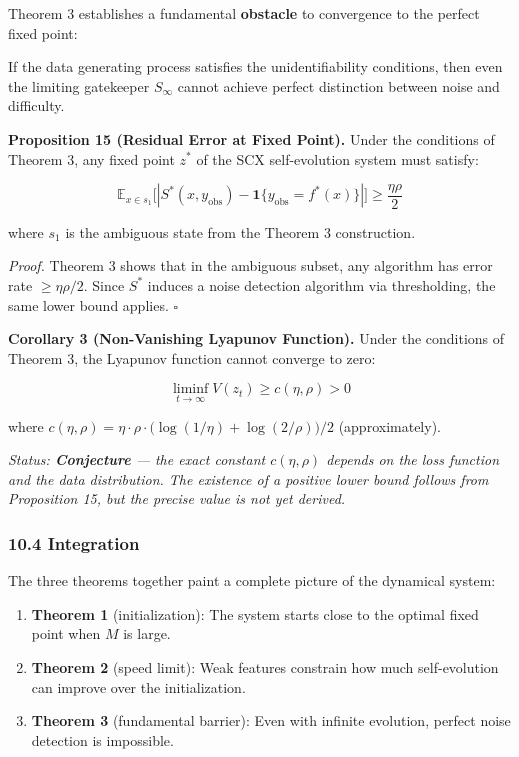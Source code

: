 \documentclass[
  12pt,
]{article}
\providecommand{\tightlist}{%
  \setlength{\itemsep}{0pt}\setlength{\parskip}{0pt}}
\begin{document}
Theorem 3 establishes a fundamental \textbf{obstacle} to convergence to
the perfect fixed point:

If the data generating process satisfies the unidentifiability
conditions, then even the limiting gatekeeper \(S_\infty\) cannot
achieve perfect distinction between noise and difficulty.

\textbf{Proposition 15 (Residual Error at Fixed Point).} Under the
conditions of Theorem 3, any fixed point \(z^*\) of the SCX
self-evolution system must satisfy:

\[\mathbb{E}_{x \in s_1}\bigl[ |S^*(x, y_{\text{obs}}) - \mathbf{1}\{y_{\text{obs}} = f^*(x)\}| \bigr] \geq \frac{\eta\rho}{2}\]

where \(s_1\) is the ambiguous state from the Theorem 3 construction.

\emph{Proof.} Theorem 3 shows that in the ambiguous subset, any
algorithm has error rate \(\geq \eta\rho/2\). Since \(S^*\) induces a
noise detection algorithm via thresholding, the same lower bound
applies. \(\square\)

\textbf{Corollary 3 (Non-Vanishing Lyapunov Function).} Under the
conditions of Theorem 3, the Lyapunov function cannot converge to zero:

\[\liminf_{t \to \infty} V(z_t) \geq c(\eta, \rho) > 0\]

where
\(c(\eta, \rho) = \eta \cdot \rho \cdot \bigl( \log(1/\eta) + \log(2/\rho) \bigr) / 2\)
(approximately).

\emph{Status: \textbf{Conjecture} --- the exact constant
\(c(\eta, \rho)\) depends on the loss function and the data
distribution. The existence of a positive lower bound follows from
Proposition 15, but the precise value is not yet derived.}

\subsubsection{10.4 Integration}\label{integration}

The three theorems together paint a complete picture of the dynamical
system:

\begin{enumerate}
\def\labelenumi{\arabic{enumi}.}
\tightlist
\item
  \textbf{Theorem 1} (initialization): The system starts close to the
  optimal fixed point when \(M\) is large.
\item
  \textbf{Theorem 2} (speed limit): Weak features constrain how much
  self-evolution can improve over the initialization.
\item
  \textbf{Theorem 3} (fundamental barrier): Even with infinite
  evolution, perfect noise detection is impossible.
\end{enumerate}
\end{document}
